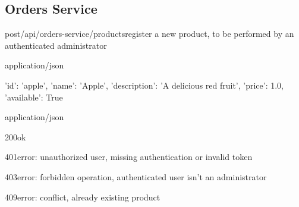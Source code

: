 \pagebreak
\subsection{Orders Service}

\begin{apiRoute}{post}{/api/orders-service/products}{register a new product, to be performed by an authenticated administrator}
	\begin{routeParameter}
	\end{routeParameter}
	\begin{routeRequest}{application/json}
		\begin{routeRequestBody}
{
    'id': 'apple',
    'name': 'Apple',
    'description': 'A delicious red fruit',
    'price': 1.0,
    'available': True
}
		\end{routeRequestBody}
	\end{routeRequest}
	\begin{routeResponse}{application/json}
	    \begin{routeResponseItem}{200}{ok}
	        \begin{routeResponseItemBody}
			\end{routeResponseItemBody}
		\end{routeResponseItem}
    	\begin{routeResponseItem}{401}{error: unauthorized user, missing authentication or invalid token}
    	    \begin{routeResponseItemBody}
			\end{routeResponseItemBody}
		\end{routeResponseItem}
		\begin{routeResponseItem}{403}{error: forbidden operation, authenticated user isn't an administrator}
    	    \begin{routeResponseItemBody}
			\end{routeResponseItemBody}
		\end{routeResponseItem}
        \begin{routeResponseItem}{409}{error: conflict, already existing product}
            \begin{routeResponseItemBody}
			\end{routeResponseItemBody}
		\end{routeResponseItem}
	\end{routeResponse}
\end{apiRoute}

